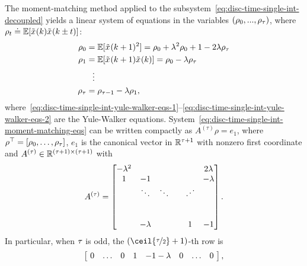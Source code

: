 The moment-matching method applied to the subsystem~\eqref{eq:disc-time-single-int-decoupled} yields 
a linear system of equations in the variables $ (\rho_0,...,\rho_\tau) $,
where $ \rho_t \doteq \mathbb{E}[\tilde{x}_{}(k)\tilde{x}_{}(k\pm t)] $:
\begin{subequations}\label{eq:disc-time-single-int-moment-matching-eqs}
	\begin{align}
		\rho_0 &= \mathbb{E}[\tilde{x}_{}(k+1)^2] = \rho_0 + \lambda^2\rho_0 + 1 - 2\lambda\rho_\tau \label{eq:disc-time-single-int-first-moment-eq}\\
		\rho_1 &= \mathbb{E}[\tilde{x}_{}(k+1)\tilde{x}_{}(k)] = \rho_0 - \lambda\rho_\tau \label{eq:disc-time-single-int-yule-walker-eqs-1}\\
		&\hspace{2mm}\vdots \nonumber \\
		\rho_\tau &= \rho_{\tau-1} - \lambda\rho_1, \label{eq:disc-time-single-int-yule-walker-eqs-2}
	\end{align}
\end{subequations}
where~\eqref{eq:disc-time-single-int-yule-walker-eqs-1}--\eqref{eq:disc-time-single-int-yule-walker-eqs-2} are the Yule-Walker equations.
System~\eqref{eq:disc-time-single-int-moment-matching-eqs}
can be written compactly as $ A^{(\tau)}\rho = e_1 $, where
$ \rho^\top = [\rho_0,\dots,\rho_{\tau}]$,
$ e_1 $ is the canonical vector in $ { {\mathbb R}^{\tau+1} } $ with nonzero first coordinate and $ A^{(\tau)}\in{ {\mathbb R}^{(\tau+1)\times(\tau+1)} } $ with
\begin{equation}\label{eq:explicit-variance-matrix-A}
	A^{(\tau)} = \begin{bmatrix}
		-\lambda^2 &   		&     		& 		 &   	  & 2\lambda\\
		1 		 & -1 		&     		& 		 &    	  & -\lambda\\
		& 	\ddots	& \ddots	&  		 & \iddots&  \\
		& 			& 			&		 & 		  &  \\
		& 			& 			&		 & 		  &  \\
		& -\lambda	& 			& 		 & 1 	  & -1
	\end{bmatrix}.
\end{equation}
In particular, when $ \tau $ is odd, the $ (\ceil{\nicefrac{\delayn}{2}} + 1) $-th row is
\begin{equation}\label{eq:app-explicit-variance-matrix-A-mid-row-odd}
	\left[\!\begin{array}{cccccccc}
		0 & \dots & 0 & 1 & -1-\lambda & 0 & \dots & 0
	\end{array}\!\right],
\end{equation}
